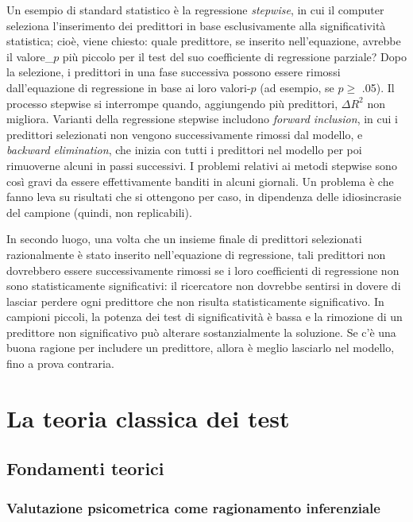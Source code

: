 \documentclass[
  11pt,
]{krantz}
\theoremstyle{definition}
\theoremstyle{definition}
\theoremstyle{definition}
\theoremstyle{definition}
\theoremstyle{remark}
\begin{document}
Un esempio di standard statistico è la regressione \emph{stepwise}, in cui il computer seleziona l'inserimento dei predittori in base esclusivamente alla significatività statistica; cioè, viene chiesto: quale predittore, se inserito nell'equazione, avrebbe il valore\_\(p\) più piccolo per il test del suo coefficiente di regressione parziale? Dopo la selezione, i predittori in una fase successiva possono essere rimossi dall'equazione di regressione in base ai loro valori-\(p\) (ad esempio, se \(p \geq\) .05). Il processo stepwise si interrompe quando, aggiungendo più predittori, \(\Delta R^2\) non migliora. Varianti della regressione stepwise includono \emph{forward inclusion}, in cui i predittori selezionati non vengono successivamente rimossi dal modello, e \emph{backward elimination}, che inizia con tutti i predittori nel modello per poi rimuoverne alcuni in passi successivi. I problemi relativi ai metodi stepwise sono così gravi da essere effettivamente banditi in alcuni giornali. Un problema è che fanno leva su risultati che si ottengono per caso, in dipendenza delle idiosincrasie del campione (quindi, non replicabili).

In secondo luogo, una volta che un insieme finale di predittori selezionati razionalmente è stato inserito nell'equazione di regressione, tali predittori non dovrebbero essere successivamente rimossi se i loro coefficienti di regressione non sono statisticamente significativi: il ricercatore non dovrebbe sentirsi in dovere di lasciar perdere ogni predittore che non risulta statisticamente significativo. In campioni piccoli, la potenza dei test di significatività è bassa e la rimozione di un predittore non significativo può alterare sostanzialmente la soluzione. Se c'è una buona ragione per includere un predittore, allora è meglio lasciarlo nel modello, fino a prova contraria.

\hypertarget{part-la-teoria-classica-dei-test}{%
\part{La teoria classica dei test}\label{part-la-teoria-classica-dei-test}}

\hypertarget{ch:teoria_classica}{%
\chapter{Fondamenti teorici}\label{ch:teoria_classica}}

\hypertarget{valutazione-psicometrica-come-ragionamento-inferenziale}{%
\section{Valutazione psicometrica come ragionamento inferenziale}\label{valutazione-psicometrica-come-ragionamento-inferenziale}}
\end{document}
